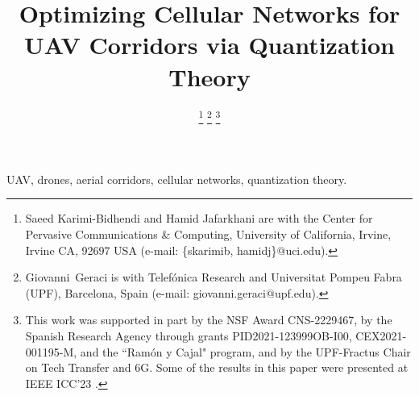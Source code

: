 \documentclass[journal]{IEEEtran}
\begin{document}
\title{Optimizing Cellular Networks for UAV Corridors via Quantization Theory}

\author{ 
\thanks{Saeed Karimi-Bidhendi and Hamid Jafarkhani are with the Center for Pervasive Communications \& Computing, University of California, Irvine, Irvine CA, 92697 USA (e-mail: \{skarimib, hamidj\}$@$uci.edu).}
\thanks{Giovanni~Geraci is with Telef\'{o}nica Research and Universitat Pompeu Fabra (UPF), Barcelona, Spain (e-mail: giovanni.geraci$@$upf.edu).}
\thanks{This work was supported in part by the NSF Award CNS-2229467, by the Spanish Research Agency through grants PID2021-123999OB-I00, CEX2021-001195-M, and the ``Ram\'{o}n y Cajal" program, and by the UPF-Fractus Chair on Tech Transfer and 6G. Some of the results in this paper were presented at IEEE ICC'23 \cite{KarGerJafICC2023}.}
}


\maketitle



\begin{IEEEkeywords}
UAV, drones, aerial corridors, cellular networks, quantization theory.
\end{IEEEkeywords}

\IEEEpeerreviewmaketitle









\balance


% 

\end{document}
